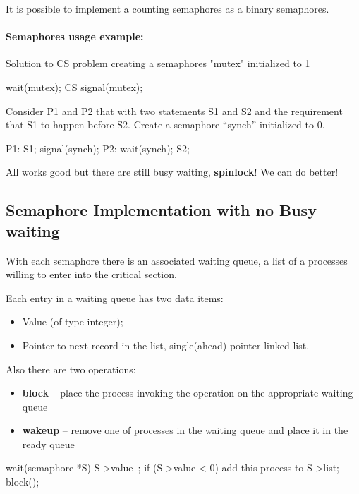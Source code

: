 It is possible to implement a counting semaphores as a binary semaphores.

\paragraph{Semaphores usage example:} Solution to CS problem creating a semaphores "mutex" initialized to 1

\begin{codeInC}
wait(mutex);
    CS
signal(mutex);
\end{codeInC}

Consider P1 and P2 that with two statements S1 and S2 and
the requirement that S1 to happen before S2. Create a semaphore “synch” initialized to 0.

\begin{codeInC}
P1:
    S1;
    signal(synch);
P2:
    wait(synch);
    S2;
\end{codeInC}

All works good but there are still busy waiting, \textbf{spinlock}! We can do better!

\newpage
\subsection{Semaphore Implementation with no Busy waiting}
With each semaphore there is an associated waiting queue, a list of a processes willing to enter into the critical section.

Each entry in a waiting queue has two data items:

\begin{itemize}
    \item Value (of type integer);
    \item Pointer to next record in the list, single(ahead)-pointer linked list.
\end{itemize}

Also there are two operations:

\begin{itemize}
    \item \textbf{block} – place the process invoking the operation on the appropriate waiting queue
    \item \textbf{wakeup} – remove one of processes in the waiting queue and place it in the ready queue
\end{itemize}


\begin{codeInC}
wait(semaphore *S) {
    S->value--;
    if (S->value < 0) {
        add this process to S->list;
        block();
    }
}
\end{codeInC}


